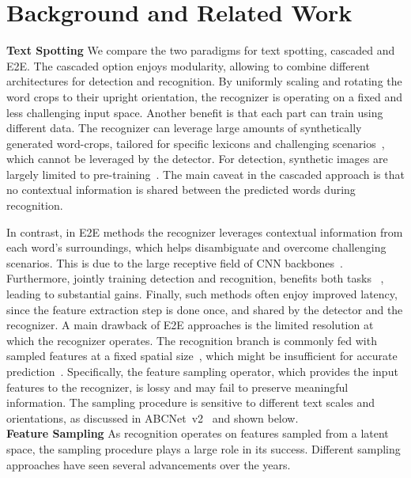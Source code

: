 \documentclass[runningheads]{llncs}
\begin{document}
 
\section{Background and Related Work}
\label{sec:background}

\noindent \textbf{Text Spotting}
We compare the two paradigms for text spotting, cascaded and E2E.
The cascaded option enjoys modularity, allowing to combine different architectures for detection and recognition.
By uniformly scaling and rotating the word crops to their upright orientation, the recognizer is operating on a fixed and less challenging input space.
Another benefit is that each part can train using different data.
The recognizer can leverage large amounts of synthetically generated word-crops, tailored for specific lexicons and challenging scenarios~\cite{synthtextJaderberg14c,synthadd_aaai19}, which cannot be leveraged by the detector.
For detection, synthetic images are largely limited to pre-training~\cite{gupta2016synthetic,long2020unrealtext}.
The main caveat in the cascaded approach is that no contextual information is shared between the predicted words during recognition.


In contrast, in E2E methods  the recognizer leverages contextual information from each word's surroundings, which helps disambiguate and overcome challenging scenarios. 
This is due to the large receptive field of CNN backbones~\cite{luo2016understanding}.
Furthermore, jointly training detection and recognition, benefits both tasks ~\cite{qin2019towards,wang2021towards}, leading to substantial gains.
Finally, such methods often enjoy improved latency, since the feature extraction step is done once, and shared by the detector and the recognizer.
A main drawback of E2E approaches is the limited resolution at which the recognizer operates.
The recognition branch is commonly fed with sampled features at a fixed spatial size~\cite{liao2020spotterV3,liu2021abcnetV2,baek2020crafts,qiao2020mango}, which might be insufficient for accurate prediction~\cite{lu2021master,shi2018aster,litman2020scatter}.
Specifically, the feature sampling operator, which provides the input features to the recognizer, is lossy and may fail to preserve meaningful information.
The sampling procedure is sensitive to different text scales and orientations, as discussed in ABCNet~v2~\cite{liu2021abcnetV2} and shown below.\\





\noindent \textbf{Feature Sampling}
As recognition operates on features sampled from a latent space, the  sampling procedure plays a large role in its success.
Different sampling approaches have seen several advancements over the years.
\end{document}
